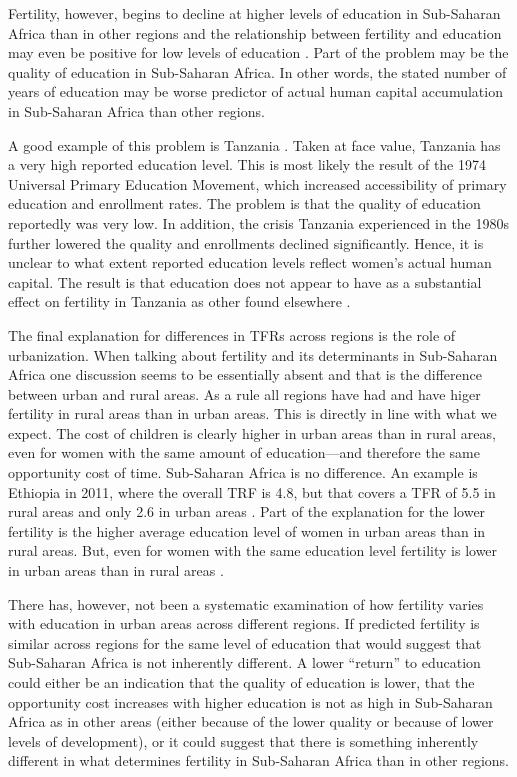 \documentclass[letterpaper,12pt]{article}
\begin{document}
Fertility, however, begins to decline at higher levels of 
education in Sub-Saharan Africa than in other regions
and the relationship between fertility and education
may even be positive for low levels of 
education  \citep{Ainsworth1996,Benefo1996,Thomas1996}.
Part of the problem may be the quality of education in Sub-Saharan 
Africa. 
In other words, the stated number of years of education
may be worse predictor of actual human capital accumulation
in Sub-Saharan Africa than other regions.

A good example of this problem is Tanzania \citep{Galabawa2001,Wedgwood2005}.
Taken at face value, Tanzania has a very high reported education level.
This is most likely the result of the 1974 Universal Primary Education 
Movement, which increased accessibility of primary education and 
enrollment rates.
The problem is that the quality of education reportedly was very low. 
In addition, the crisis Tanzania experienced in the 1980s further 
lowered the quality and enrollments declined significantly. 
Hence, it is unclear to what extent reported education levels 
reflect women's actual human capital.
The result is that education does not appear to have as a substantial
effect on fertility in Tanzania as other found elsewhere \citet{Alam2016}.


The final explanation for differences in TFRs across
regions is the role of urbanization.
When talking about fertility and its determinants in
Sub-Saharan Africa one discussion seems to be essentially
absent and that is the difference between urban and rural areas.
As a rule all regions have had and have higer fertility in
rural areas than in urban areas.
This is directly in line with what we expect.
The cost of children is clearly higher in urban areas than
in rural areas, even for women with the same amount of education---and
therefore the same opportunity cost of time.
Sub-Saharan Africa is no difference.
An example is Ethiopia in 2011, where the overall TRF is 4.8, but 
that covers a TFR of 5.5 in rural areas and only 2.6 in urban 
areas \citep{Central-Statistical-Agency/Ethiopia2012}.
Part of the explanation for the lower fertility is the
higher average education level of women in urban areas
than in rural areas.
But, even for women with the same education level fertility
is lower in urban areas than in rural areas \citep{Ainsworth1996}.

There has, however, not been a systematic examination of
how fertility varies with education in urban areas across
different regions.
If predicted fertility is similar across regions for the
same level of education that would suggest that Sub-Saharan Africa
is not inherently different.
A lower ``return'' to education could either be an indication
that the quality of education is lower, that the opportunity
cost increases with higher education is not as high in
Sub-Saharan Africa as in other areas (either because of
the lower quality or because of lower levels of development),
or it could suggest that there is something inherently
different in what determines fertility in Sub-Saharan Africa
than in other regions.
\end{document}
